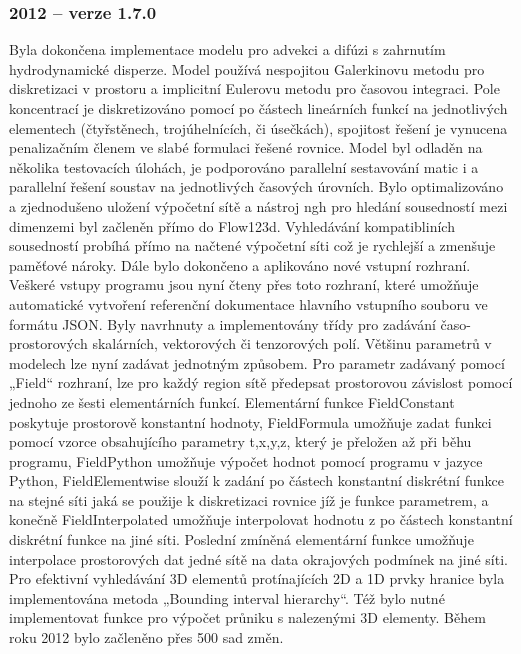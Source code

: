 \documentclass[11pt]{article}
\begin{document}
\subsubsection{2012 -- verze 1.7.0}
Byla dokončena implementace modelu pro advekci a difúzi s zahrnutím 
hydrodynamické disperze. Model používá nespojitou Galerkinovu metodu pro 
diskretizaci v prostoru a implicitní Eulerovu metodu pro časovou integraci.  
Pole koncentrací je diskretizováno pomocí po částech lineárních funkcí na 
jednotlivých elementech (čtyřstěnech, trojúhelnících, či úsečkách), spojitost 
řešení je vynucena penalizačním členem ve slabé formulaci řešené rovnice. Model 
byl odladěn na několika testovacích úlohách, je podporováno parallelní 
sestavování matic i a parallelní řešení soustav na jednotlivých časových 
úrovních.
Bylo optimalizováno a zjednodušeno uložení výpočetní sítě a nástroj ngh pro 
hledání sousedností mezi dimenzemi byl začleněn přímo do Flow123d. Vyhledávání 
kompatibliních sousedností probíhá přímo na načtené výpočetní síti což je 
rychlejší a zmenšuje paměťové nároky. 
Dále bylo dokončeno a aplikováno nové vstupní rozhraní. Veškeré vstupy programu 
jsou nyní čteny přes toto rozhraní, které umožňuje automatické vytvoření 
referenční dokumentace hlavního vstupního souboru ve formátu JSON.
Byly navrhnuty a implementovány třídy pro zadávání časo-prostorových skalárních, 
vektorových či tenzorových polí. Většinu parametrů v modelech lze nyní zadávat 
jednotným způsobem. Pro parametr zadávaný pomocí „Field“ rozhraní, lze pro každý 
region sítě předepsat prostorovou závislost pomocí jednoho ze šesti 
elementárních funkcí. Elementární funkce FieldConstant poskytuje prostorově 
konstantní hodnoty, FieldFormula umožňuje zadat funkci pomocí vzorce 
obsahujícího parametry t,x,y,z, který je přeložen až při běhu programu, 
FieldPython umožňuje výpočet hodnot pomocí programu v jazyce Python, 
FieldElementwise slouží k zadání po částech konstantní diskrétní funkce na 
stejné síti jaká se použije k diskretizaci rovnice jíž je funkce parametrem, a 
konečně FieldInterpolated umožňuje interpolovat hodnotu z po částech konstantní 
diskrétní funkce na jiné síti. 
Poslední zmíněná elementární funkce umožňuje interpolace prostorových dat jedné 
sítě na data okrajových podmínek na jiné síti. Pro efektivní vyhledávání 3D 
elementů protínajících 2D a 1D prvky hranice byla implementována metoda  
„Bounding interval hierarchy“. Též bylo nutné implementovat funkce pro výpočet 
průniku s nalezenými 3D elementy.
 Během roku 2012 bylo začleněno přes 500 sad změn. 
\end{document}
